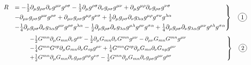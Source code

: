 \documentclass{article}
\numberwithin{equation}{section}
\newcommand*\circled[1]{\tikz[baseline=(char.base)]{ \node[shape=circle,draw,inner sep=2pt] (char) {#1};}} %
\newcommand\f[1]{\mathopen{\hphantom{#1}}} %
\begin{document}
\begin{equation*}
\begin{split}
\begin{rcases}
R &= - \frac{1}{2}\partial_{\mu}{g_{\rho \sigma}} \partial_{\nu}{g^{\mu \nu}} g^{\rho \sigma} - \frac{1}{2}\partial_{\mu}{g^{\rho \sigma}} \partial_{\nu}{g_{\rho \sigma}} g^{\mu \nu} + \partial_{\mu}{g^{\mu \rho}} \partial_{\nu}{g_{\rho \sigma}} g^{\nu \sigma}\\
& -\partial_{\mu \nu}{g_{\rho \sigma}} g^{\mu \nu} g^{\rho \sigma} +\partial_{\mu \nu}{g_{\rho \sigma}} g^{\mu \rho} g^{\nu \sigma} + \frac{1}{2}\partial_{\mu}{g_{\rho \sigma}} \partial_{\nu}{g_{\lambda \alpha}} g^{\mu \rho} g^{\sigma \nu} g^{\lambda \alpha}\\
&- \frac{1}{4}\partial_{\mu}{g_{\rho \sigma}} \partial_{\nu}{g_{\lambda \alpha}} g^{\mu \nu} g^{\rho \sigma} g^{\lambda \alpha} - \frac{1}{2}\partial_{\mu}{g_{\rho \sigma}} \partial_{\nu}{g_{\lambda \alpha}} g^{\mu \lambda} g^{\rho \nu} g^{\sigma \alpha} + \frac{1}{4}\partial_{\mu}{g_{\rho \sigma}} \partial_{\nu}{g_{\lambda \alpha}} g^{\mu \nu} g^{\rho \lambda} g^{\sigma \alpha}\\
\end{rcases}
\quad \circled{1}
\end{split}
\end{equation*}
\begin{equation}\label{R}
\begin{split}
\begin{rcases}
& \f{1234567} - \frac{1}{2}G^{m n} \partial_{\mu}{G_{m n}} \partial_{\nu}{g^{\mu \nu}} - \frac{1}{2}\partial_{\mu}{G_{m n}} \partial_{\nu}{G^{m n}} g^{\mu \nu} -\partial_{\mu \nu}{G_{m n}} G^{m n} g^{\mu \nu} \f{12345678912345} \\
& \f{1234567} - \frac{1}{4}G^{m n} G^{o p} \partial_{\mu}{G_{m n}} \partial_{\nu}{G_{o p}} g^{\mu \nu}
+ \frac{1}{4}G^{m n} G^{o p} \partial_{\mu}{G_{m o}} \partial_{\nu}{G_{n p}} g^{\mu \nu} \f{12345678912345}\\
& \f{1234567} +\frac{1}{2}G^{m n} \partial_{\mu}{G_{m n}} \partial_{\nu}{g_{\rho \sigma}} g^{\mu \rho} g^{\nu \sigma} - \frac{1}{2}G^{m n} \partial_{\mu}{G_{m n}} \partial_{\nu}{g_{\rho \sigma}} g^{\mu \nu} g^{\rho \sigma} \f{12345678912345}
\end{rcases}
\quad \circled{2}
\end{split}
\end{equation}
\end{document}
